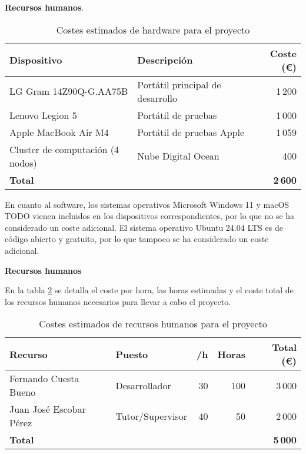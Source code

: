\textbf{Recursos humanos}.

\begin{table}[h!]
    \centering
    \begin{tabular}{|l|l|r|}
        \hline
        \textbf{Dispositivo}             & \textbf{Descripción}             & \textbf{Coste (€)} \\
        \hline
        LG Gram 14Z90Q-G.AA75B           & Portátil principal de desarrollo & 1\,200             \\
        Lenovo Legion 5                  & Portátil de pruebas              & 1\,000             \\
        Apple MacBook Air M4             & Portátil de pruebas Apple        & 1\,059             \\
        Cluster de computación (4 nodos) & Nube Digital Ocean               & 400                \\
        \hline
        \textbf{Total}                   &                                  & \textbf{2\,600}    \\
        \hline
    \end{tabular}
    \caption{Costes estimados de hardware para el proyecto}
    \label{tab:costes-hardware}
\end{table}

En cuanto al software, los sistemas operativos Microsoft Windows 11 y macOS {TODO} vienen incluidos en los dispositivos correspondientes, por lo que no se ha considerado un coste adicional. El sistema operativo Ubuntu 24.04 LTS es de código abierto y gratuito, por lo que tampoco se ha considerado un coste adicional.

\textbf{Recursos humanos}

En la tabla \ref{tab:recursos-humanos} se detalla el coste por hora, las horas estimadas y el coste total de los recursos humanos necesarios para llevar a cabo el proyecto.

\begin{table}[h!]
    \centering
    \begin{tabular}{|l|l|r|r|r|}
        \hline
        \textbf{Recurso}        & \textbf{Puesto}  & \textbf{/h} & \textbf{Horas} & \textbf{Total (€)} \\
        \hline
        Fernando Cuesta Bueno   & Desarrollador    & 30          & 100            & 3\,000             \\
        Juan José Escobar Pérez & Tutor/Supervisor & 40          & 50             & 2\,000             \\
        \hline
        \textbf{Total}          &                  &             &                & \textbf{5\,000}    \\
        \hline
    \end{tabular}
    \caption{Costes estimados de recursos humanos para el proyecto}
    \label{tab:recursos-humanos}
\end{table}

